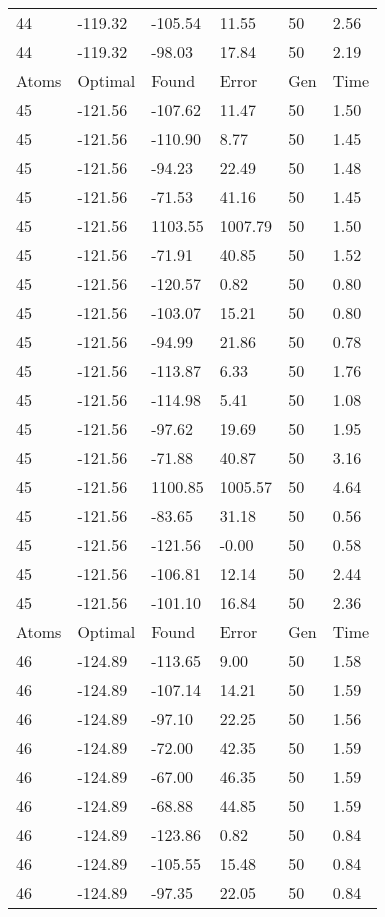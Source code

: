 \documentclass{report}
\begin{document}
\begin{appendix}
\begin{longtable}{llllll}
44 & -119.32 & -105.54 & 11.55 & 50 & 2.56 \\
44 & -119.32 & -98.03 & 17.84 & 50 & 2.19 \\
Atoms & Optimal & Found & Error & Gen & Time \\
45 & -121.56 & -107.62 & 11.47 & 50 & 1.50 \\
45 & -121.56 & -110.90 & 8.77 & 50 & 1.45 \\
45 & -121.56 & -94.23 & 22.49 & 50 & 1.48 \\
45 & -121.56 & -71.53 & 41.16 & 50 & 1.45 \\
45 & -121.56 & 1103.55 & 1007.79 & 50 & 1.50 \\
45 & -121.56 & -71.91 & 40.85 & 50 & 1.52 \\
45 & -121.56 & -120.57 & 0.82 & 50 & 0.80 \\
45 & -121.56 & -103.07 & 15.21 & 50 & 0.80 \\
45 & -121.56 & -94.99 & 21.86 & 50 & 0.78 \\
45 & -121.56 & -113.87 & 6.33 & 50 & 1.76 \\
45 & -121.56 & -114.98 & 5.41 & 50 & 1.08 \\
45 & -121.56 & -97.62 & 19.69 & 50 & 1.95 \\
45 & -121.56 & -71.88 & 40.87 & 50 & 3.16 \\
45 & -121.56 & 1100.85 & 1005.57 & 50 & 4.64 \\
45 & -121.56 & -83.65 & 31.18 & 50 & 0.56 \\
45 & -121.56 & -121.56 & -0.00 & 50 & 0.58 \\
45 & -121.56 & -106.81 & 12.14 & 50 & 2.44 \\
45 & -121.56 & -101.10 & 16.84 & 50 & 2.36 \\
Atoms & Optimal & Found & Error & Gen & Time \\
46 & -124.89 & -113.65 & 9.00 & 50 & 1.58 \\
46 & -124.89 & -107.14 & 14.21 & 50 & 1.59 \\
46 & -124.89 & -97.10 & 22.25 & 50 & 1.56 \\
46 & -124.89 & -72.00 & 42.35 & 50 & 1.59 \\
46 & -124.89 & -67.00 & 46.35 & 50 & 1.59 \\
46 & -124.89 & -68.88 & 44.85 & 50 & 1.59 \\
46 & -124.89 & -123.86 & 0.82 & 50 & 0.84 \\
46 & -124.89 & -105.55 & 15.48 & 50 & 0.84 \\
46 & -124.89 & -97.35 & 22.05 & 50 & 0.84 \\

\end{longtable}
\end{appendix}
\end{document}
